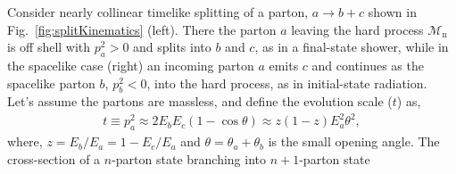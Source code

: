 Consider nearly collinear timelike splitting of a parton, \(a\to b+c\) shown in Fig.~\ref{fig:splitKinematics} (left). There the parton \(a\) leaving the hard process \(\mathcal{M}_\mathrm{n}\) is off shell with \(p_a^2 > 0\) and splits into \(b\) and \(c\), as in a final-state shower, while in the spacelike case (right) an incoming parton \(a\) emits \(c\) and continues as the spacelike parton \(b\), \(p_b^2 < 0\), into the hard process, as in initial-state radiation. Let's assume the partons are massless, and define the evolution scale (\(t\)) as,
\begin{align}
	t \equiv p_a^2 \approx 2E_bE_c(1 - \cos\theta)  \approx z(1-z)E_a^2\theta^2,
\end{align}
where, \(z = E_b/E_a = 1 - E_c/E_a\) and \(\theta = \theta_a + \theta_b\) is the small opening angle.  The cross-section of a \(n\)-parton state branching into \(n+1\)-parton state~\cite{Ellis_Stirling_Webber_1996}
%
%
%
%
%
